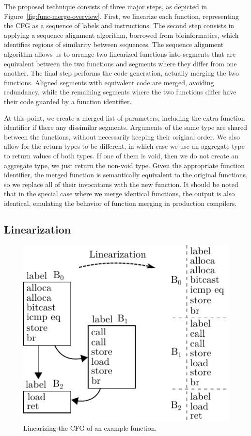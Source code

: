 The proposed technique consists of three major steps, as depicted in
Figure~\ref{fig:func-merge-overview}.
First, we linearize each function, representing the CFG as a sequence of
labels and instructions.
The second step consists in applying a sequence alignment algorithm, borrowed
from bioinformatics, which identifies regions of similarity between sequences.
The sequence alignment algorithm allows us to arrange two linearized functions
into segments that are equivalent between the two functions and segments where
they differ from one another.
The final step performs the code generation, actually merging the two functions.
Aligned segments with equivalent code are merged, avoiding redundancy, %
while the remaining segments where the two functions differ have their code guarded by a function identifier.

At this point, we create a merged list of parameters, including the extra function identifier if there any
dissimilar segments. 
Arguments of the same type are shared between the functions, without necessarily keeping their original
order.
We also allow for the return types to be different, in which case we use an aggregate type to return values of both types.
If one of them is void, then we do not create an aggregate type, we just return the non-void type.
Given the appropriate function identifier, the merged function is semantically equivalent to the original functions,
so we replace all of their invocations with the new function.
It should be noted that in the special case where we merge identical functions, the output is also identical, emulating
the behavior of function merging in production compilers.

\subsection{Linearization}

\begin{figure}[t!]
  \centering
  \includegraphics[width=0.7\linewidth]{figs/linearization-example.pdf}
  \caption{Linearizing the CFG of an example function.}
  \label{fig:linearization-example}
\end{figure}


